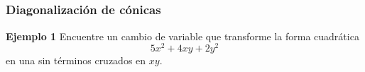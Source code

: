 %
%
%
%
%
%
%


\subsection{}

\begin{frame}\frametitle{Diagonalización de cónicas}

\begin{ej}{\textbf{Ejemplo 1}} \justifying
	Encuentre un cambio de variable que transforme la forma cuadrática
	\[
		5x^2 + 4xy + 2y^2
	\]
	en una sin términos cruzados en $xy$.
\end{ej}

\end{frame}

